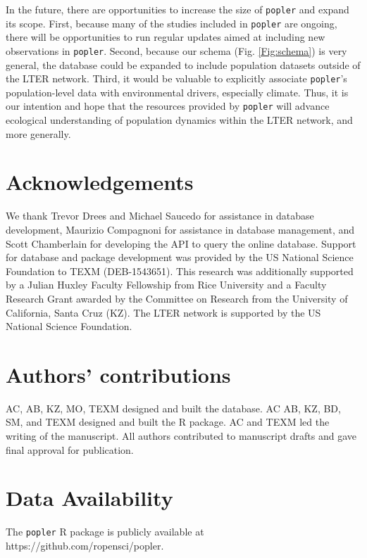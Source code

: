 \documentclass{article}\usepackage[]{graphicx}\usepackage[]{color}
\begin{document}
In the future, there are opportunities to increase the size of \texttt{popler} and expand its scope. First, because many of the studies included in \texttt{popler} are ongoing, there will be opportunities to run regular updates aimed at including new observations in \texttt{popler}. Second, because our schema (Fig. \ref{Fig:schema}) is very general, the database could be expanded to include population datasets outside of the LTER network. Third, it would be valuable to explicitly associate \texttt{popler}'s population-level data with environmental drivers, especially climate. Thus, it is our intention and hope that the resources provided by \texttt{popler} will advance ecological understanding of population dynamics within the LTER network, and more generally.

\section*{Acknowledgements}
We thank Trevor Drees and Michael Saucedo for assistance in database development, Maurizio Compagnoni for assistance in database management, and Scott Chamberlain for developing the API to query the online database. Support for database and package development was provided by the US National Science Foundation to TEXM (DEB-1543651). This research was additionally supported by a Julian Huxley Faculty Fellowship from Rice University and a Faculty Research Grant awarded by the Committee on Research from the University of California, Santa Cruz (KZ). The LTER network is supported by the US National Science Foundation.

\section*{Authors' contributions}
AC, AB, KZ, MO, TEXM designed and built the database. AC AB, KZ, BD, SM, and TEXM designed and built the R package. AC and TEXM led the writing of the manuscript. All authors contributed to manuscript drafts and gave final approval for publication.

\section*{Data Availability}
The \texttt{popler} R package is publicly available at https://github.com/ropensci/popler.


\end{document}
